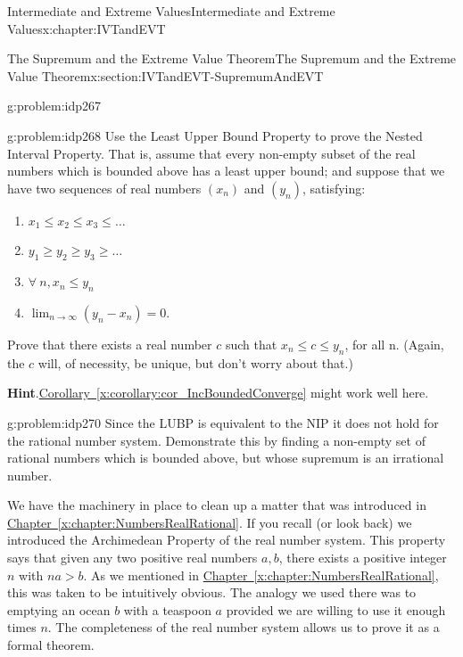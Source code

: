 \begin{chapterptx}{Intermediate and Extreme Values}{}{Intermediate and Extreme Values}{}{}{x:chapter:IVTandEVT}
\begin{sectionptx}{The Supremum and the Extreme Value Theorem}{}{The Supremum and the Extreme Value Theorem}{}{}{x:section:IVTandEVT-SupremumAndEVT}
\begin{problem}{}{g:problem:idp267}
		\end{problem}
		\begin{problem}{}{g:problem:idp268}%
			 Use the Least Upper Bound Property to prove the Nested Interval Property. That is, assume that every non-empty subset of the real numbers which is bounded above has a least upper bound; and suppose that we have two sequences of real numbers \(\left(x_n\right)\) and \(\left(y_n\right)\), satisfying:%
			\begin{enumerate}
				\item{}\(\displaystyle x_1\le x_2 \le x_3 \le \ldots\)%
				\item{}\(\displaystyle y_1\ge y_2 \ge y_3 \ge \ldots\)%
				\item{}\(\displaystyle \forall\ n, x_n\le y_n\)%
				\item{}\(\displaystyle\lim_{n\rightarrow\infty}\left(y_n-x_n\right) = 0\).%
			\end{enumerate}
			\par
			Prove that there exists a real number \(c\) such that \(x_n\le c\le y_n\), for all n. (Again, the \(c\) will, of necessity, be unique, but don't worry about that.)%
			\par\smallskip%
			\noindent\textbf{\blocktitlefont Hint}.\hypertarget{g:hint:idp269}{}\quad{}\hyperref[x:corollary:cor_IncBoundedConverge]{Corollary~{\xreffont\ref{x:corollary:cor_IncBoundedConverge}}} might work well here.%
		\end{problem}
		\begin{problem}{}{g:problem:idp270}%
			 Since the LUBP is equivalent to the NIP it does not hold for the rational number system. Demonstrate this by finding a non-empty set of rational numbers which is bounded above, but whose supremum is an irrational number.%
		\end{problem}
		We have the machinery in place to clean up a matter that was introduced in \hyperref[x:chapter:NumbersRealRational]{Chapter~{\xreffont\ref{x:chapter:NumbersRealRational}}}. If you recall (or look back) we introduced the Archimedean Property of the real number system. This property says that given any two positive real numbers \(a, b\), there exists a positive integer \(n\) with \(na>b\). As we mentioned in \hyperref[x:chapter:NumbersRealRational]{Chapter~{\xreffont\ref{x:chapter:NumbersRealRational}}}, this was taken to be intuitively obvious. The analogy we used there was to emptying an ocean \(b\) with a teaspoon \(a\) provided we are willing to use it enough times \(n\). The completeness of the real number system allows us to prove it as a formal theorem.%

\end{sectionptx}
\end{chapterptx}
